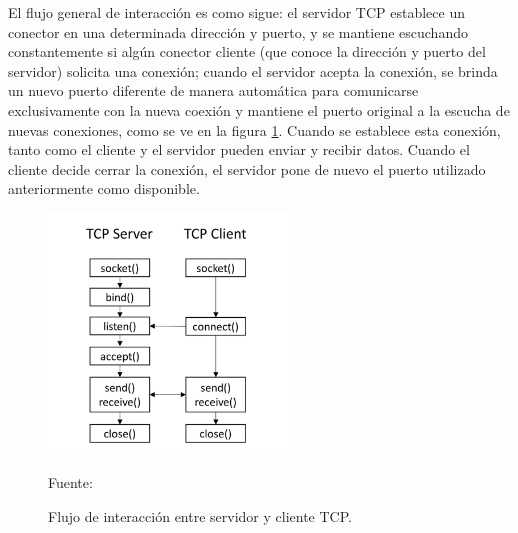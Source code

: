 

El flujo general de interacción es como sigue: el servidor TCP establece un conector en una determinada dirección y puerto, y se mantiene escuchando constantemente si algún conector cliente (que conoce la dirección y puerto del servidor) solicita una conexión; cuando el servidor acepta la conexión, se brinda un nuevo puerto diferente de manera automática para comunicarse exclusivamente con la nueva coexión y mantiene el puerto original a la escucha de nuevas conexiones, como se ve en la figura \ref{fig:tcp_flow}. Cuando se establece esta conexión, tanto como el cliente y el servidor pueden enviar y recibir datos. Cuando el cliente decide cerrar la conexión, el servidor pone de nuevo el puerto utilizado anteriormente como disponible.\\

\begin{figure}[H]
    \begin{center}
        \includegraphics[width=6.4cm]{img/capitulo_2/tcp.png}
    \end{center}
    \begin{center}
        \caption{Flujo de interacción entre servidor y cliente TCP.}
        Fuente: \cite{tcpsocket}
        \label{fig:tcp_flow}
    \end{center}
\end{figure}

